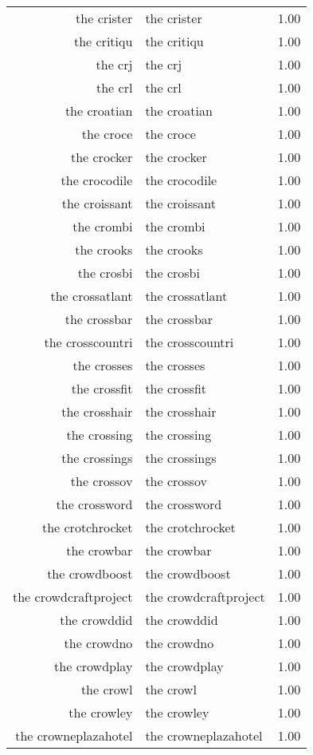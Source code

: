 \begin{table}[ht]
\begin{tabular}{rlr}
  the crister & the crister & 1.00 \\ 
  the critiqu & the critiqu & 1.00 \\ 
  the crj & the crj & 1.00 \\ 
  the crl & the crl & 1.00 \\ 
  the croatian & the croatian & 1.00 \\ 
  the croce & the croce & 1.00 \\ 
  the crocker & the crocker & 1.00 \\ 
  the crocodile & the crocodile & 1.00 \\ 
  the croissant & the croissant & 1.00 \\ 
  the crombi & the crombi & 1.00 \\ 
  the crooks & the crooks & 1.00 \\ 
  the crosbi & the crosbi & 1.00 \\ 
  the crossatlant & the crossatlant & 1.00 \\ 
  the crossbar & the crossbar & 1.00 \\ 
  the crosscountri & the crosscountri & 1.00 \\ 
  the crosses & the crosses & 1.00 \\ 
  the crossfit & the crossfit & 1.00 \\ 
  the crosshair & the crosshair & 1.00 \\ 
  the crossing & the crossing & 1.00 \\ 
  the crossings & the crossings & 1.00 \\ 
  the crossov & the crossov & 1.00 \\ 
  the crossword & the crossword & 1.00 \\ 
  the crotchrocket & the crotchrocket & 1.00 \\ 
  the crowbar & the crowbar & 1.00 \\ 
  the crowdboost & the crowdboost & 1.00 \\ 
  the crowdcraftproject & the crowdcraftproject & 1.00 \\ 
  the crowddid & the crowddid & 1.00 \\ 
  the crowdno & the crowdno & 1.00 \\ 
  the crowdplay & the crowdplay & 1.00 \\ 
  the crowl & the crowl & 1.00 \\ 
  the crowley & the crowley & 1.00 \\ 
  the crowneplazahotel & the crowneplazahotel & 1.00 \\ 

\end{tabular}
\end{table}
